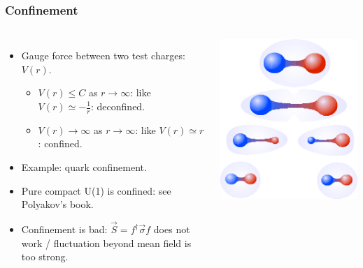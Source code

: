 \documentclass[xcolor=table, 10pt, aspectratio=43]{beamer}
\begin{document}
\begin{frame}
  \frametitle{Confinement}
  \begin{columns}
    \begin{itemize}
      \item Gauge force between two test charges: $V(r)$.
      \begin{itemize}
        \item $V(r)\leq C$ as $r\rightarrow \infty$: like $V(r)\simeq -\frac1r$: deconfined.
        \item $V(r)\rightarrow\infty$ as $r\rightarrow \infty$: like $V(r)\simeq r$: confined.
      \end{itemize}
      \item Example: quark confinement.
      \item Pure compact U(1) is confined: see Polyakov's book.
      \item Confinement is bad:
      $\vec S=f^\dagger \vec\sigma f$ does not work / fluctuation beyond mean field is too strong.
    \end{itemize}
    \begin{center}
      \includegraphics[width=.8\textwidth]{QCD-confinement}
    \end{center}
  \end{columns}
\end{frame}
\end{document}
